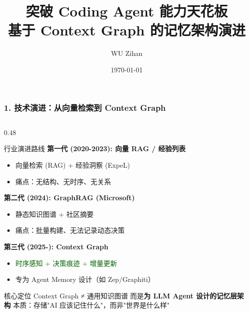 \documentclass[aspectratio=169,10pt]{beamer}
\title{突破 Coding Agent 能力天花板\\{\large 基于 Context Graph 的记忆架构演进}}
\author{WU Zihan}
\date{\today}
\begin{document}
\begin{frame}
  \maketitle
\end{frame}

\begin{frame}
  \frametitle{1. 技术演进：从向量检索到 Context Graph}

  \begin{columns}[T]
    \begin{column}{0.48\textwidth}
      \begin{block}{行业演进路线}
        \scriptsize
        \textbf{第一代 (2020-2023): 向量 RAG / 经验列表}
        \begin{itemize}
            \item 向量检索 (RAG) + 经验洞察 (ExpeL)
            \item \textcolor{dotred}{痛点：无结构、无时序、无关系}
        \end{itemize}

        \vspace{0.05cm}
        \textbf{第二代 (2024): GraphRAG (Microsoft)}
        \begin{itemize}
            \item 静态知识图谱 + 社区摘要
            \item \textcolor{dotred}{痛点：批量构建、无法记录动态决策}
        \end{itemize}

        \vspace{0.05cm}
        \textbf{第三代 (2025-): Context Graph}
        \begin{itemize}
            \item \textcolor{darkgreen}{时序感知 + 决策痕迹 + 增量更新}
            \item 专为 Agent Memory 设计（如 Zep/Graphiti）
        \end{itemize}
      \end{block}

      \vspace{0.05cm}

      \begin{alertblock}{核心定位}
        \scriptsize
        Context Graph ≠ 通用知识图谱
        \newline 而是\textbf{为 LLM Agent 设计的记忆层架构}
        \newline 本质：存储"AI 应该记住什么"，而非"世界是什么样"
      \end{alertblock}
    \end{column}


\end{columns}
\end{frame}
\end{document}
